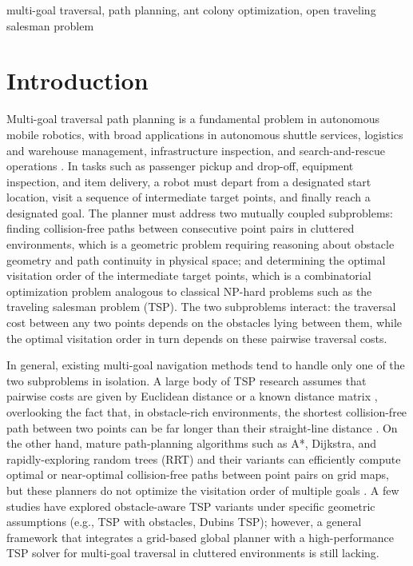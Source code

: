 \documentclass[lettersize,journal]{IEEEtran}
\begin{document}
\begin{IEEEkeywords}

multi-goal traversal, path planning, ant colony optimization, open traveling salesman problem

\end{IEEEkeywords}

\section{Introduction}

Multi-goal traversal path planning is a fundamental problem in autonomous mobile robotics, with broad applications in autonomous shuttle services, logistics and warehouse management, infrastructure inspection, and search-and-rescue operations \textcolor{blue}{\cite{ref1,ref2,ref33,ref37,ref38}}. In tasks such as passenger pickup and drop-off, equipment inspection, and item delivery, a robot must depart from a designated start location, visit a sequence of intermediate target points, and finally reach a designated goal. The planner must address two mutually coupled subproblems: finding collision-free paths between consecutive point pairs in cluttered environments, which is a geometric problem requiring reasoning about obstacle geometry and path continuity in physical space; and determining the optimal visitation order of the intermediate target points, which is a combinatorial optimization problem analogous to classical NP-hard problems such as the traveling salesman problem (TSP). The two subproblems interact: the traversal cost between any two points depends on the obstacles lying between them, while the optimal visitation order in turn depends on these pairwise traversal costs.

In general, existing multi-goal navigation methods tend to handle only one of the two subproblems in isolation. A large body of TSP research assumes that pairwise costs are given by Euclidean distance or a known distance matrix \textcolor{blue}{\cite{ref4,ref36}}, overlooking the fact that, in obstacle-rich environments, the shortest collision-free path between two points can be far longer than their straight-line distance \textcolor{blue}{\cite{ref39}}. On the other hand, mature path-planning algorithms such as A*, Dijkstra, and rapidly-exploring random trees (RRT) and their variants can efficiently compute optimal or near-optimal collision-free paths between point pairs on grid maps, but these planners do not optimize the visitation order of multiple goals \textcolor{blue}{\cite{ref5,ref6,ref7}}. A few studies have explored obstacle-aware TSP variants under specific geometric assumptions (e.g., TSP with obstacles, Dubins TSP); however, a general framework that integrates a grid-based global planner with a high-performance TSP solver for multi-goal traversal in cluttered environments is still lacking.
\end{document}
